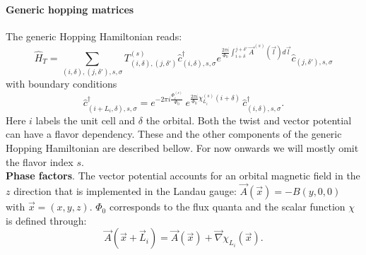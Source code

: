 \paragraph*{Generic hopping matrices}\label{sec:generic_hopping}

The generic Hopping Hamiltonian  reads: 
\begin{equation}
\hat{H}_T = \sum_{(i,\delta), (j,\delta'), s, \sigma}    T_{(i,\delta), (j,\delta')}^{(s)}    \hat{c}^{\dagger}_{(i,\delta),s,\sigma }   e^{\frac{2 \pi i}{\Phi_0} \int_{i + \delta}^{j + \delta'}  \vec{A}^{(s)}(\vec{l})  d \vec{l}} \hat{c}^{}_{(j,\delta'),s,\sigma }
\label{generic_hopping.eq}
\end{equation}
with boundary conditions 
\begin{equation}
\hat{c}^{\dagger}_{(i + L_i,\delta) ,s,\sigma }   =  e^{- 2 \pi i\frac{\Phi_i^{(s)}}{\Phi_0}} \, e^{\frac{2 \pi i }{\Phi_0} \chi^{(s)}_{L_i} ( i + \delta ) } \, \hat{c}^{\dagger}_{(i,\delta) ,s,\sigma }.
\label{generic_boundary.eq}
\end{equation}
Here $i$  labels the unit cell and $\delta$    the orbital.
Both the twist and  vector  potential can have a flavor dependency. These and the other components of the generic Hopping Hamiltonian are described bellow. For now onwards we will  mostly omit the flavor index ${s}$.\\

\noindent
\textbf{Phase factors}.  
The vector potential accounts for an orbital magnetic field in the $z$ direction that is implemented  in the Landau  gauge:  $\vec{A}(\vec{x})  =  -B(y,0,0) $ with $ \vec{x} = (x,y,z)$. $\Phi_0$ corresponds to the flux quanta and the scalar function $\chi$ is defined through:
\begin{equation}
\vec{A}( \vec{x} + \vec{L}_{i} )  = \vec{A}( \vec{x} )   +  \vec{\nabla} \chi_{L_{i}}(\vec{x}). 
\end{equation}

